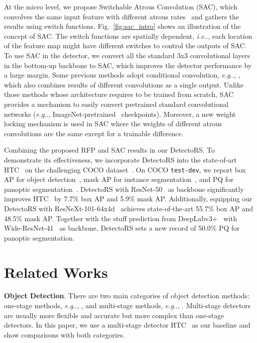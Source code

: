 \documentclass[final]{cvpr}
\makeatletter
\def\@onedot{\ifx\@let@token.\else.\null\fi\xspace}
\DeclareRobustCommand\onedot{\futurelet\@let@token\@onedot}
\def\eg{\emph{e.g}\onedot} \def\Eg{\emph{E.g}\onedot}
\def\ie{\emph{i.e}\onedot} \def\Ie{\emph{I.e}\onedot}
\makeatother
\begin{document}
At the micro level, we propose Switchable Atrous Convolution (SAC), which convolves the same input feature with different atrous rates~\cite{holschneider1989real,papandreou2014untangling,chen2014semantic} and gathers the results using switch functions.
Fig.~\ref{fig:sac_intro} shows an illustration of the concept of SAC.
The switch functions are spatially dependent, \ie, each location of the feature map might have different switches to control the outputs of SAC.
To use SAC in the detector, we convert all the standard 3x3 convolutional layers in the bottom-up backbone to SAC, which improves the detector performance by a large margin.
Some previous methods adopt conditional convolution, \eg, \cite{condconv,li2019selective}, which also combines results of different convolutions as a single output.
Unlike those methods whose architecture requires to be trained from scratch, SAC provides a mechanism to easily convert pretrained standard convolutional networks (\eg, ImageNet-pretrained~\cite{imagenet} checkpoints).
Moreover, a new weight locking mechanism is used in SAC where the weights of different atrous convolutions are the same except for a trainable difference.

Combining the proposed RFP and SAC results in our DetectoRS. To demonstrate its effectiveness, we incorporate DetectoRS into the state-of-art HTC~\cite{htc} on the challenging COCO dataset~\cite{coco}.
On COCO \texttt{test-dev}, we report box AP for object detection~\cite{everingham2015pascal}, mask AP for instance segmentation~\cite{hariharan2014simultaneous}, and PQ for panoptic segmentation~\cite{kirillov2019panoptic}. DetectoRS with ResNet-50~\cite{resnet} as backbone significantly improves HTC~\cite{htc} by 7.7\% box AP and 5.9\% mask AP. Additionally, equipping our DetectoRS with ResNeXt-101-64x4d~\cite{resnext} achieves state-of-the-art 55.7\% box AP and 48.5\% mask AP.
Together with the stuff prediction from DeepLabv3+~\cite{deeplabv3plus2018} with Wide-ResNet-41~\cite{sslpanopticdeeplab2020} as backbone, DetectoRS sets a new record of 50.0\% PQ for panoptic segmentation.
 \section{Related Works}

\noindent\textbf{Object Detection}.
There are two main categories of object detection methods: one-stage methods, \eg, \cite{sermanet2013overfeat,liu2016ssd,redmon2017yolo9000,lin2017focal,zhang2018single,zhao2019m2det,wang2020fcos,li2020learning},
and multi-stage methods, \eg, \cite{girshick2015fast,fasterrcnn,maskrcnn,chen2018masklab,cascadercnn,htc,cao2020d2det,wu2020rethinking,guo2020augfpn,jiang2020sp}.
Multi-stage detectors are usually more flexible and accurate but more complex than one-stage detectors.
In this paper, we use a multi-stage detector HTC~\cite{htc} as our baseline and show comparisons with both categories.
\end{document}
